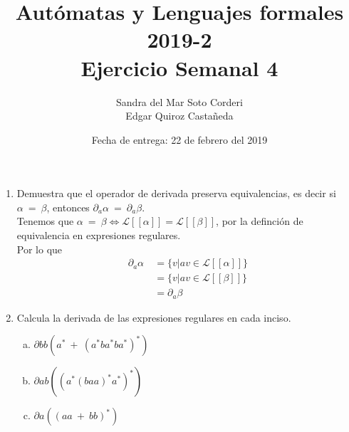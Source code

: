 \documentclass{article}
\begin{document}
    
    \title{Autómatas y Lenguajes formales 2019-2\\
    \large Ejercicio Semanal 4}

    \date{Fecha de entrega: 22 de febrero del 2019}

    \author{Sandra del Mar Soto Corderi\\
    Edgar Quiroz Castañeda}

    \maketitle


    \begin{enumerate}
        \item {
        Demuestra que el operador de derivada preserva equivalencias, es decir si
        $\alpha \ = \ \beta$, entonces $\partial_{a} \alpha \ = \ \partial_{a} \beta$.\\
        Tenemos que $\alpha \ = \ \beta \iff 
        \mathcal{L}[\![\alpha]\!] = \mathcal{L}[\![\beta]\!]$, por la definción
        de equivalencia en expresiones regulares. \\
        Por lo que 
        \begin{align*}
            \partial_{a} \alpha \ &= \{v | av \in \mathcal{L}[\![\alpha]\!]\} \\
                                  &= \{v | av \in \mathcal{L}[\![\beta]\!]\} \\
                                  &= \partial_{a} \beta
        \end{align*}

            
        }
        
        \item{
        Calcula la derivada de las expresiones regulares en cada inciso.\\
		\begin{enumerate}[a)]
		
		\item{
		$\partial{bb} (a^* \ + \  (a^*ba^*ba^*)^*)$\\
		
		
		}
		
		\item{
		$\partial{ab} ((a^*(baa)^*a^*)^*)$\\
		
		
		}
		
		\item{
		$\partial{a} ((aa \  + \  bb)^*)$\\
		
		
		}		
		
		\end{enumerate}		        
        
        
        }
    \end{enumerate}
\end{document}
